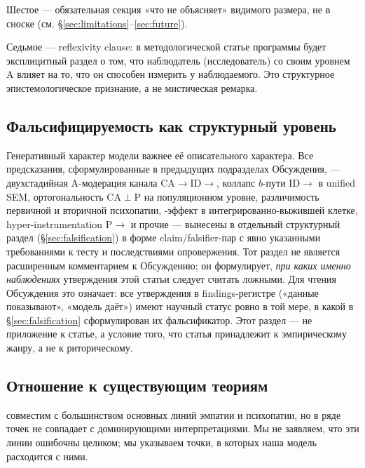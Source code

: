 Шестое --- обязательная секция «что \DEIC{} не объясняет» видимого размера, не в сноске (см. §\ref{sec:limitations}--\ref{sec:future}).

Седьмое --- reflexivity clause: в методологической статье программы будет эксплицитный раздел о том, что наблюдатель (исследователь) со своим уровнем A влияет на то, что он способен измерить у наблюдаемого. Это структурное эпистемологическое признание, а не мистическая ремарка.

\subsection{Фальсифицируемость как структурный уровень}
\label{subsec:falsifiers}

Генеративный характер модели важнее её описательного характера. Все предсказания, сформулированные в предыдущих подразделах Обсуждения, --- двухстадийная A-модерация канала CA$\to$ID$\to$\EAF{}, коллапс $b$-пути ID$\to$\EAF{} в unified SEM, ортогональность CA$\perp$P на популяционном уровне, различимость первичной и вторичной психопатии, \EAF{}-эффект в интегрированно-выжившей клетке, hyper-instrumentation P$\to$\Ecog{} и прочие --- вынесены в отдельный структурный раздел (§\ref{sec:falsification}) в форме claim/falsifier-пар с явно указанными требованиями к тесту и последствиями опровержения. Тот раздел не является расширенным комментарием к Обсуждению; он формулирует, \emph{при каких именно наблюдениях} утверждения этой статьи следует считать ложными. Для чтения Обсуждения это означает: все утверждения в findings-регистре («данные показывают», «модель даёт») имеют научный статус ровно в той мере, в какой в §\ref{sec:falsification} сформулирован их фальсификатор. Этот раздел --- не приложение к статье, а условие того, что статья принадлежит к эмпирическому жанру, а не к риторическому.

\subsection{Отношение к существующим теориям}
\label{subsec:relation_to_theories}

\DEIC{} совместим с большинством основных линий эмпатии и психопатии, но в ряде точек не совпадает с доминирующими интерпретациями. Мы не заявляем, что эти линии ошибочны целиком; мы указываем точки, в которых наша модель расходится с ними.


